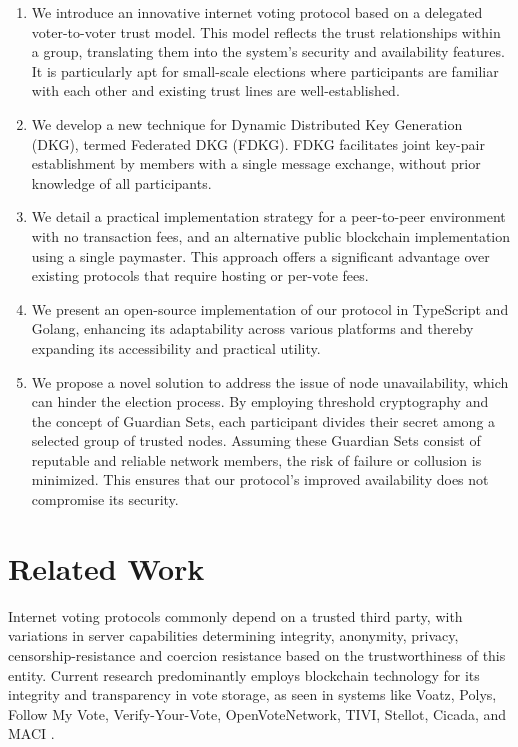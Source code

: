 \documentclass[runningheads]{llncs}
\begin{document}
\begin{enumerate}
    \item We introduce an innovative internet voting protocol based on a delegated voter-to-voter trust model. This model reflects the trust relationships within a group, translating them into the system’s security and availability features. It is particularly apt for small-scale elections where participants are familiar with each other and existing trust lines are well-established.
    
    \item We develop a new technique for Dynamic Distributed Key Generation (DKG), termed Federated DKG (FDKG). FDKG facilitates joint key-pair establishment by members with a single message exchange, without prior knowledge of all participants.
            
    \item We detail a practical implementation strategy for a peer-to-peer environment with no transaction fees, and an alternative public blockchain implementation using a single paymaster. This approach offers a significant advantage over existing protocols that require hosting or per-vote fees.

    \item We present an open-source implementation of our protocol in TypeScript and Golang, enhancing its adaptability across various platforms and thereby expanding its accessibility and practical utility.
    
    \item We propose a novel solution to address the issue of node unavailability, which can hinder the election process. By employing threshold cryptography and the concept of Guardian Sets, each participant divides their secret among a selected group of trusted nodes. Assuming these Guardian Sets consist of reputable and reliable network members, the risk of failure or collusion is minimized. This ensures that our protocol’s improved availability does not compromise its security.
\end{enumerate}


\section{Related Work}

Internet voting protocols commonly depend on a trusted third party, with variations in server capabilities determining integrity, anonymity, privacy, censorship-resistance and coercion resistance based on the trustworthiness of this entity. Current research predominantly employs blockchain technology for its integrity and transparency in vote storage, as seen in systems like Voatz, Polys, Follow My Vote, Verify-Your-Vote, OpenVoteNetwork, TIVI, Stellot, Cicada, and MACI \cite{mooreWestVirginiaMobile2019, PolysOnlineVoting, SecureDecentralizedApplication2023, chaiebVerifyYourVoteVerifiableBlockchainBased2019, haoAnonymousVotingTworound2010, mccorrySmartContractBoardroom2017, seifelnasrScalableOpenVoteNetwork2020, elsheikhDisputefreeScalableOpen2022, TIVIPoweredSmartmatic, NowYouCan2016, baranskiPracticalIVotingStellar2020, BuildingCicadaPrivate, A16zCicada2023, ethereumfoundationMinimalAntiCollusionInfrastructure2022, PrivacyscalingexplorationsMaci2023}.
\end{document}
